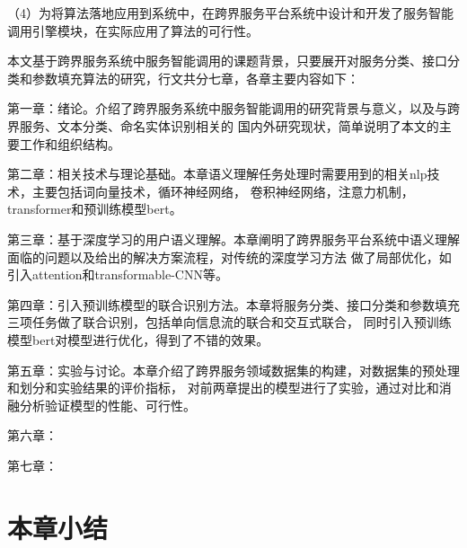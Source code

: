 （4）为将算法落地应用到系统中，在跨界服务平台系统中设计和开发了服务智能调用引擎模块，在实际应用了算法的可行性。

本文基于跨界服务系统中服务智能调用的课题背景，只要展开对服务分类、接口分类和参数填充算法的研究，行文共分七章，各章主要内容如下：

第一章：绪论。介绍了跨界服务系统中服务智能调用的研究背景与意义，以及与跨界服务、文本分类、命名实体识别相关的
国内外研究现状，简单说明了本文的主要工作和组织结构。

第二章：相关技术与理论基础。本章语义理解任务处理时需要用到的相关nlp技术，主要包括词向量技术，循环神经网络，
卷积神经网络，注意力机制，transformer和预训练模型bert。

第三章：基于深度学习的用户语义理解。本章阐明了跨界服务平台系统中语义理解面临的问题以及给出的解决方案流程，对传统的深度学习方法
做了局部优化，如引入attention和transformable-CNN等。

第四章：引入预训练模型的联合识别方法。本章将服务分类、接口分类和参数填充三项任务做了联合识别，包括单向信息流的联合和交互式联合，
同时引入预训练模型bert对模型进行优化，得到了不错的效果。

第五章：实验与讨论。本章介绍了跨界服务领域数据集的构建，对数据集的预处理和划分和实验结果的评价指标，
对前两章提出的模型进行了实验，通过对比和消融分析验证模型的性能、可行性。

第六章：

第七章：

\section{本章小结}

